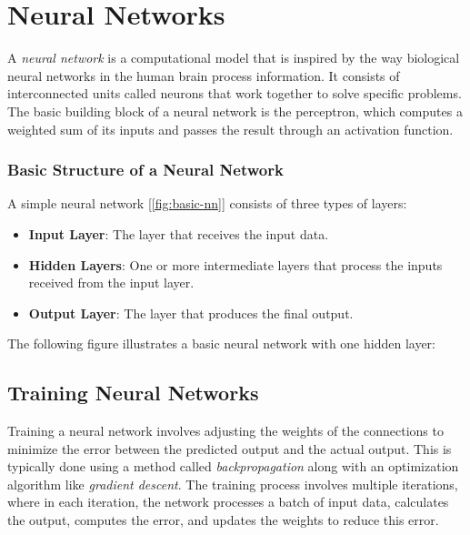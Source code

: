 \documentclass[../Thesis.tex]{subfiles}
\begin{document}
\section{Neural Networks}
\label{sec:neural_networks}

A \emph{neural network} is a computational model that is inspired by the way biological neural networks in the human brain process information. It consists of interconnected units called neurons that work together to solve specific problems. The basic building block of a neural network is the perceptron, which computes a weighted sum of its inputs and passes the result through an activation function.

\subsubsection{Basic Structure of a Neural Network}

A simple neural network [\autoref{fig:basic-nn}] consists of three types of layers:

\begin{itemize}
    \item \textbf{Input Layer}: The layer that receives the input data.
    \item \textbf{Hidden Layers}: One or more intermediate layers that process the inputs received from the input layer.
    \item \textbf{Output Layer}: The layer that produces the final output.
\end{itemize}

The following figure illustrates a basic neural network with one hidden layer:


\subsection{Training Neural Networks}
Training a neural network involves adjusting the weights of the connections to minimize the error between the predicted output and the actual output. This is typically done using a method called \emph{backpropagation} along with an optimization algorithm like \emph{gradient descent}. The training process involves multiple iterations, where in each iteration, the network processes a batch of input data, calculates the output, computes the error, and updates the weights to reduce this error.
\end{document}
